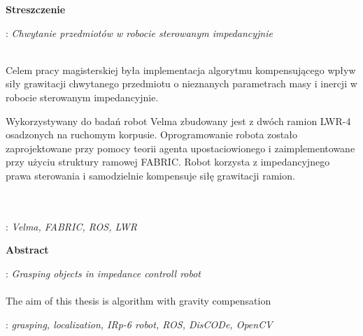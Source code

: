 


\clearpage\mbox{}\thispagestyle{empty}\newpage




%

\clearpage\mbox{}\newpage



\vspace*{\baselineskip}
\begin{center}
	{\large\bfseries Streszczenie}\par\bigskip
\end{center}
: {\itshape Chwytanie przedmiotów w robocie sterowanym impedancyjnie}
\\\\
{
	Celem pracy magisterskiej była implementacja algorytmu kompensującego wpływ siły grawitacji chwytanego przedmiotu o nieznanych parametrach masy i inercji w robocie sterowanym impedancyjnie.
	
	Wykorzystywany do badań robot Velma zbudowany jest z dwóch ramion LWR-4 osadzonych na ruchomym korpusie. Oprogramowanie robota zostało zaprojektowane przy pomocy teorii agenta upostaciowionego i zaimplementowane przy użyciu struktury ramowej FABRIC. Robot korzysta z impedancyjnego prawa sterowania i samodzielnie kompensuje siłę grawitacji ramion. 
}\\\\
\vspace*{0.6\baselineskip}
: {\itshape Velma, FABRIC, ROS, LWR}

\clearpage\mbox{}\newpage


\vspace*{\baselineskip}
\begin{center}
	{\large\bfseries Abstract}\par\bigskip
\end{center}
: {\itshape Grasping objects in impedance controll robot}
\\\\
{ 
	The aim of this thesis is algorithm with gravity compensation 
}\par
\vspace*{1\baselineskip}
: {\itshape grasping, localization, IRp-6 robot, ROS, DisCODe, OpenCV}

\clearpage\mbox{}\newpage



\clearpage\mbox{}\newpage




